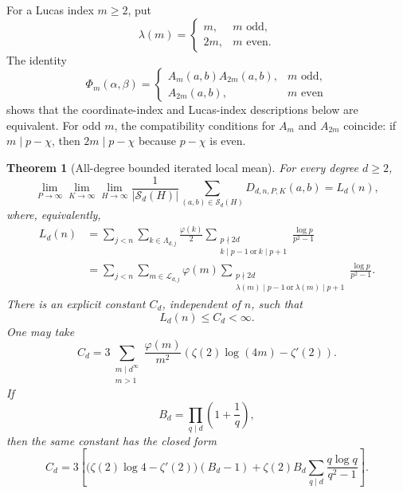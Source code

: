 \documentclass[11pt]{article}
\newtheorem{theorem}{Theorem}
\theoremstyle{definition}
\theoremstyle{remark}
\newcommand{\Sset}{\mathcal S}
\begin{document}
For a Lucas index $m\ge2$, put
\[
 \lambda(m)=
 \begin{cases}
  m,&m\text{ odd},\\
  2m,&m\text{ even}.
 \end{cases}
 \tag{6.11}
\]
The identity
\[
 \Phi_m(\alpha,\beta)=
 \begin{cases}
  A_m(a,b)A_{2m}(a,b),&m\text{ odd},\\
  A_{2m}(a,b),&m\text{ even}
 \end{cases}
 \tag{6.12}
\]
shows that the coordinate-index and Lucas-index descriptions below are
equivalent.  For odd $m$, the compatibility conditions for $A_m$ and
$A_{2m}$ coincide: if \(m\mid p-\chi\), then
\(2m\mid p-\chi\) because $p-\chi$ is even.

\begin{theorem}[All-degree bounded iterated local mean]\label{thm:local-mean}
For every degree $d\ge2$,
\[
 \lim_{P\to\infty}\lim_{K\to\infty}\lim_{H\to\infty}
 \frac{1}{|\Sset_d(H)|}
 \sum_{(a,b)\in\Sset_d(H)}D_{d,n,P,K}(a,b)
 =L_d(n),
 \tag{6.13}
\]
where, equivalently,
\begin{align}
 L_d(n)
 &=\sum_{j<n}\sum_{k\in\Lambda_{d,j}}\frac{\varphi(k)}2
 \sum_{\substack{p\nmid2d\\k\mid p-1\ \mathrm{or}\ k\mid p+1}}
 \frac{\log p}{p^2-1}
 \tag{6.14}\\
 &=\sum_{j<n}\sum_{m\in\mathcal L_{d,j}}\varphi(m)
 \sum_{\substack{p\nmid2d\\
 \lambda(m)\mid p-1\ \mathrm{or}\ \lambda(m)\mid p+1}}
 \frac{\log p}{p^2-1}.
 \tag{6.15}
\end{align}
There is an explicit constant $C_d$, independent of $n$, such that
\[
 L_d(n)\le C_d<\infty.
 \tag{6.16}
\]
One may take
\[
 C_d=3\sum_{\substack{m\mid d^\infty\\m>1}}
 \frac{\varphi(m)}{m^2}
 \left(\zeta(2)\log(4m)-\zeta'(2)\right).
 \tag{6.17}
\]
If
\[
 B_d=\prod_{q\mid d}\left(1+\frac1q\right),
\]
then the same constant has the closed form
\[
 C_d=3\left[
  \bigl(\zeta(2)\log4-\zeta'(2)\bigr)(B_d-1)
  +\zeta(2)B_d\sum_{q\mid d}\frac{q\log q}{q^2-1}
 \right].
 \tag{6.18}
\]
\end{theorem}
\end{document}

